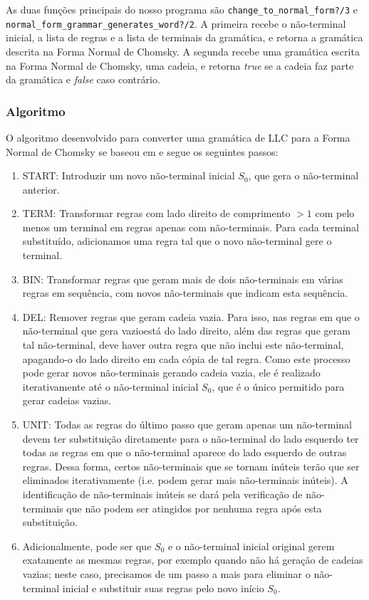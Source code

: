 \documentclass[journal,transmag]{IEEEtran}
\begin{document}
As duas funções principais do nosso programa são 
\texttt{change\_to\_normal\_form?/3} e 
\texttt{normal\_form\_grammar\_generates\_word?/2}. A primeira recebe o
não-terminal inicial, a lista de regras e a lista de terminais da gramática,
e retorna a gramática descrita na Forma Normal de Chomsky. A segunda recebe 
uma gramática escrita na Forma Normal de Chomsky, uma cadeia, e retorna \textit{true} se 
a cadeia faz parte da gramática e \textit{false} caso contrário.

\subsubsection{Algoritmo}
O algoritmo desenvolvido para converter uma gramática de LLC para a Forma Normal
de Chomsky se baseou em \cite{wikipedia} e segue os seguintes passos:

\begin{enumerate}
\item START: Introduzir um novo não-terminal inicial $S_0$, que gera o
não-terminal anterior.
\item TERM: Transformar regras com lado direito de comprimento $> 1$ com pelo
menos um terminal em regras apenas com não-terminais. Para cada terminal
substituído, adicionamos uma regra tal que o novo não-terminal gere o terminal. 
\item BIN: Transformar regras que geram mais de dois não-terminais em várias
regras em sequência, com novos não-terminais que indicam esta sequência.
\item DEL: Remover regras que geram cadeia vazia. Para isso, nas regras em que o
não-terminal que gera vazioestá do lado direito, além das regras que geram tal
não-terminal, deve haver outra regra que não inclui este não-terminal,
apagando-o do lado direito em cada cópia de tal regra. Como este processo pode
gerar novos não-terminais gerando cadeia vazia, ele é realizado iterativamente
até o não-terminal inicial $S_0$, que é o único permitido para gerar cadeias
vazias.
\item UNIT: Todas as regras do último passo que geram apenas um não-terminal
devem ter substituição diretamente para o não-terminal do lado esquerdo ter 
todas as regras em que o não-terminal aparece do lado esquerdo de outras regras.
Dessa forma, certos não-terminais que se tornam inúteis terão que ser eliminados
iterativamente (i.e. podem gerar mais não-terminais inúteis). A identificação
de não-terminais inúteis se dará pela verificação de não-terminais que não podem
ser atingidos por nenhuma regra após esta substituição.
\item Adicionalmente, pode ser que $S_0$ e o não-terminal inicial original gerem
exatamente as mesmas regras, por exemplo quando não há geração de cadeias
vazias; neste caso, precisamos de um passo a mais para eliminar o não-terminal
inicial e substituir suas regras pelo novo início $S_0$.
\end{enumerate}
\end{document}
